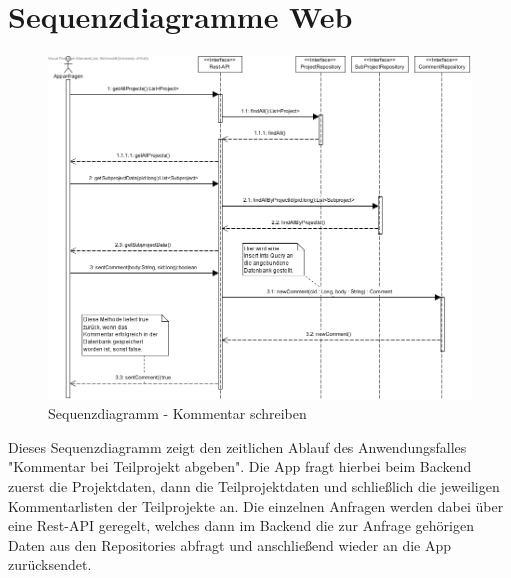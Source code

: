 \section{Sequenzdiagramme Web}


\begin{figure}[H]
	\centering
	\includegraphics[width=\textwidth]{img/seqwebcreate}		
	\caption{Sequenzdiagramm - Kommentar schreiben}
	\label{fig:sequenz-a}
\end{figure}

Dieses Sequenzdiagramm zeigt den zeitlichen Ablauf des Anwendungsfalles "Kommentar bei Teilprojekt abgeben". Die App fragt hierbei beim Backend
zuerst die Projektdaten, dann die Teilprojektdaten und schließlich die jeweiligen Kommentarlisten der Teilprojekte an. Die einzelnen Anfragen werden
dabei über eine Rest-API geregelt, welches dann im Backend die zur Anfrage gehörigen Daten aus den Repositories abfragt und anschließend wieder an die
App zurücksendet.


